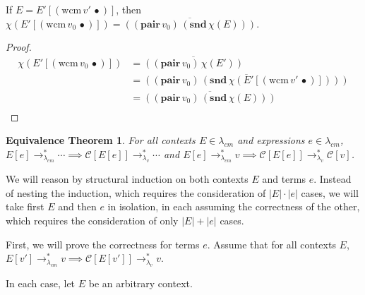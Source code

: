 \documentclass[ms,electronic,twosidetoc,letterpaper,chaptercenter,parttop]{byumsphd}
\newcommand{\pair}[2]{((\mathbf{pair}\,#1)\,#2)}
\newcommand{\eval}[1]{\overline{#1}}
\newcommand{\lvrrs}{\rightarrow_{\lambda_v}^{*}}
\newcommand{\cmrrs}{\rightarrow_{\lambda_{cm}}^{*}}
\newcommand{\C}[1]{\mathcal{C}[#1]}
\newcommand{\app}[2]{(#1\,#2)}
\newcommand{\wcm}[2]{(\mathrm{wcm}\,#1\,#2)}
\newcommand{\hole}{\bullet}
\begin{document}
\begin{lemma}
\label{wcm-collapse}
If $E=E'[\wcm{v'}{\hole}]$, then $\chi(E'[\wcm{v_0}{\hole}])=\eval{\pair{v_0}{\app{\mathbf{snd}}{\chi(E)}}}$.
\end{lemma}

\begin{proof}
\begin{align*}
\chi(E'[\wcm{v_0}{\hole}]) &= \eval{\pair{v_0}{\chi(E')}}\\
                           &= \eval{\pair{v_0}{\app{\mathbf{snd}}{\chi(E'[\wcm{v'}{\hole}])}}}\\
                           &= \eval{\pair{v_0}{\app{\mathbf{snd}}{\chi(E)}}}\\
\end{align*}
\end{proof}

\newtheorem*{eqtheorem}{Equivalence Theorem}
\begin{eqtheorem}
For all contexts $E\in\lambda_{cm}$ and expressions $e\in\lambda_{cm}$, $E[e]\cmrrs\cdots\implies\C{E[e]}\lvrrs\cdots$ and $E[e]\cmrrs v\implies\C{E[e]}\lvrrs \C{v}$.
\end{eqtheorem}

We will reason by structural induction on both contexts $E$ and terms $e$. Instead of
nesting the induction, which requires the consideration of $|E|\cdot|e|$ cases, we will
take first $E$ and then $e$ in isolation, in each assuming the correctness of the other,
which requires the consideration of only $|E|+|e|$ cases.

First, we will prove the correctness for terms $e$. Assume that for all contexts $E$,
$E[v']\cmrrs v\implies\C{E[v']}\lvrrs v$.

In each case, let $E$ be an arbitrary context.
\end{document}
